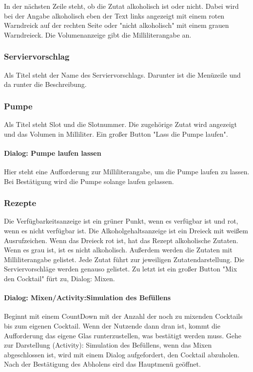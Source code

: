 In der nächsten Zeile steht, ob die Zutat alkoholisch ist oder nicht. Dabei wird bei der Angabe alkoholisch eben der Text links angezeigt mit einem roten Warndreick auf der rechten Seite oder "nicht alkoholisch" mit einem grauen Warndreieck. Die Volumenanzeige gibt die Milliliterangabe an.

\subsubsection{ Serviervorschlag}

Als Titel steht der Name des Serviervorschlags. Darunter ist die Menüzeile und da runter die Beschreibung.

\subsubsection{ Pumpe}

Als Titel steht Slot und die Slotnummer. Die zugehörige Zutat wird angezeigt und das Volumen in Milliliter. Ein großer Button "Lass die Pumpe laufen".

\paragraph{ Dialog: Pumpe laufen lassen}

Hier steht eine Aufforderung zur Milliliterangabe, um die Pumpe laufen zu lassen. Bei Bestätigung wird die Pumpe solange laufen gelassen.

\subsubsection{ Rezepte}

Die Verfügbarkeitsanzeige ist ein grüner Punkt, wenn es verfügbar ist und rot, wenn es nicht verfügbar ist. Die Alkoholgehaltsanzeige ist ein Dreieck mit weißem Ausrufzeichen. Wenn das Dreieck rot ist, hat das Rezept alkoholische Zutaten. Wenn es grau ist, ist es nicht alkoholisch. Außerdem werden die Zutaten mit Milliliterangabe gelistet. Jede Zutat führt zur jeweiligen Zutatendarstellung. Die Serviervorschläge werden genauso gelistet. Zu letzt ist ein großer Button "Mix den Cocktail" fürt zu, Dialog: Mixen.

\paragraph{ Dialog: Mixen/Activity:Simulation des Befüllens}

Beginnt mit einem CountDown mit der Anzahl der noch zu mixenden Cocktails bis zum eigenen Cocktail. Wenn der Nutzende dann dran ist, kommt die Aufforderung das eigene Glas runterzustellen, was bestätigt werden muss. Gehe zur Darstellung (Activity): Simulation des Befüllens, wenn das Mixen abgeschlossen ist, wird mit einem Dialog aufgefordert, den Cocktail abzuholen. Nach der Bestätigung des Abholens eird das Hauptmenü geöffnet.



